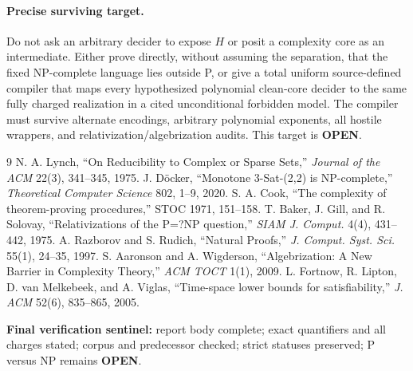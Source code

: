 \documentclass[11pt]{article}
\newcommand{\OPEN}{\textbf{OPEN}}
\begin{document}
\paragraph{Precise surviving target.}
Do not ask an arbitrary decider to expose \(H\) or posit a complexity core as
an intermediate.  Either prove directly, without assuming the separation,
that the fixed NP-complete language lies outside P, or give a total uniform
source-defined compiler that maps every hypothesized polynomial clean-core
decider to the same fully charged realization in a cited unconditional
forbidden model.  The compiler must survive alternate encodings, arbitrary
polynomial exponents, all hostile wrappers, and relativization/algebrization
audits.  This target is \OPEN.

\begin{thebibliography}{9}
 N. A. Lynch, ``On Reducibility to Complex or Sparse Sets,''
\emph{Journal of the ACM} 22(3), 341--345, 1975.
 J. D\"ocker, ``Monotone 3-Sat-(2,2) is NP-complete,''
\emph{Theoretical Computer Science} 802, 1--9, 2020.
 S. A. Cook, ``The complexity of theorem-proving
procedures,'' STOC 1971, 151--158.
 T. Baker, J. Gill, and R. Solovay,
``Relativizations of the P=?NP question,'' \emph{SIAM J. Comput.} 4(4),
431--442, 1975.
 A. Razborov and S. Rudich, ``Natural Proofs,''
\emph{J. Comput. Syst. Sci.} 55(1), 24--35, 1997.
 S. Aaronson and A. Wigderson, ``Algebrization: A New Barrier
in Complexity Theory,'' \emph{ACM TOCT} 1(1), 2009.
 L. Fortnow, R. Lipton, D. van Melkebeek, and A. Viglas,
``Time-space lower bounds for satisfiability,'' \emph{J. ACM} 52(6),
835--865, 2005.
\end{thebibliography}

\noindent\textbf{Final verification sentinel:} report body complete; exact
quantifiers and all charges stated; corpus and predecessor checked; strict
statuses preserved; P versus NP remains \OPEN.
\end{document}
